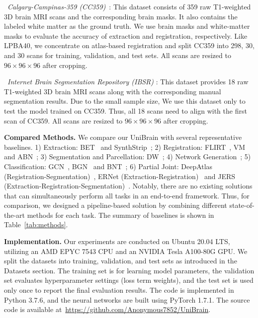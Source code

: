 \noindent\textbullet\ \textit{Calgary-Campinas-359 (CC359)}~\cite{souza2018open}: 
This dataset consists of 359 raw T1-weighted 3D brain MRI scans and the corresponding brain masks. It also contains the labeled white matter as the ground truth. We use brain masks and white-matter masks to evaluate the accuracy of extraction and registration, respectively. Like LPBA40, we concentrate on atlas-based registration and split CC359 into 298, 30, and 30 scans for training, validation, and test sets. All scans are resized to $96\times96\times96$ after cropping.


\noindent\textbullet\ \textit{Internet Brain Segmentation Repository (IBSR)} \cite{rohlfing2011image}: 
This dataset provides 18 raw T1-weighted 3D brain MRI scans along with the corresponding manual segmentation results. 
Due to the small sample size, We use this dataset only to test the model trained on CC359. 
Thus, all 18 scans need to align with the first scan of CC359. All scans are resized to $96\times96\times96$ after cropping.
\fi



\noindent\textbf{Compared Methods.} We compare our UniBrain with several representative baselines. 1) Extraction: BET~\cite{smith2002fast} and SynthStrip~\cite{hoopes2022synthstrip}; 2) Registration: FLIRT~\cite{jenkinson2001global}, VM~\cite{balakrishnan2018unsupervised} and ABN~\cite{su2022abn}; 3) Segmentation and Parcellation: DW~\cite{jaderberg2015spatial}; 4) Network Generation~\cite{zhou2022sparse}; 5) Classification: GCN~\cite{kipf2017semi}, BGN~\cite{li2021braingnn} and BNT~\cite{kan2022brain}; 6) Partial Joint: DeepAtlas (Registration-Segmentation)~\cite{xu2019deepatlas}, ERNet (Extraction-Registration)~\cite{su2022ernet} and JERS (Extraction-Registration-Segmentation)~\cite{su2023one}. Notably, there are no existing solutions that can simultaneously perform all tasks in an end-to-end framework. Thus, for comparison, we designed a pipeline-based solution by combining different state-of-the-art methods for each task. 
The summary of baselines is shown in Table~\ref{tab:methods}.

\vspace{1pt}
\noindent\textbf{Implementation.} Our experiments are
conducted on Ubuntu 20.04 LTS, utilizing an AMD EPYC
7543 CPU and an NVIDIA Tesla A100-80G GPU.
We split the datasets into training, validation, and test sets as introduced in the Datasets section. The training set is for learning model parameters, the validation set evaluates hyperparameter settings (\eg loss term weights), and the test set is used only once to report the final evaluation results. The code is implemented in Python 3.7.6, and the neural networks are built using PyTorch 1.7.1. The source code is available at~\url{https://github.com/Anonymous7852/UniBrain}.

